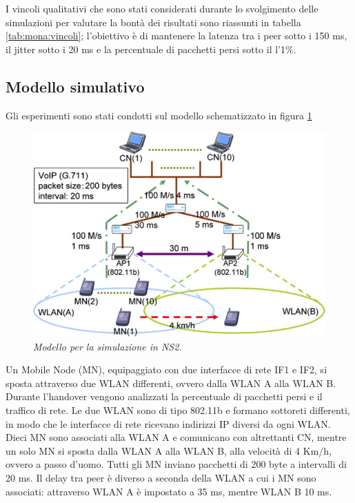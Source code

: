 \documentclass[12pt,a4paper,openright,twoside]{book}
\begin{document}
I vincoli qualitativi che sono stati considerati durante lo
svolgimento delle simulazioni per valutare la bontà dei risultati sono
riassunti in tabella \ref{tab:mona:vincoli}; l'obiettivo è di
mantenere la latenza tra i peer sotto i 150 ms, il jitter sotto i 20
ms e la percentuale di pacchetti persi sotto il l'1\%.

\subsection{Modello simulativo}

Gli esperimenti sono stati condotti sul modello schematizzato in
figura \ref{fig:mona:qos-sim-model}

\begin{figure}
  \centering
  \includegraphics[width=12cm]{img/mona-qos-sim-model}
  \caption{\em Modello per la simulazione in NS2.}
  \label{fig:mona:qos-sim-model}
\end{figure}

Un Mobile Node (MN), equipaggiato con due interfacce di rete IF1 e
IF2, si sposta attraverso due WLAN differenti, ovvero dalla WLAN A
alla WLAN B. Durante l'handover vengono analizzati la percentuale di
pacchetti persi e il traffico di rete. Le due WLAN sono di tipo
802.11b e formano sottoreti differenti, in modo che le interfacce di
rete ricevano indirizzi IP diversi da ogni WLAN. Dieci MN sono
associati alla WLAN A e comunicano con altrettanti CN, mentre un solo
MN si sposta dalla WLAN A alla WLAN B, alla velocità di 4 Km/h, ovvero
a passo d'uomo. Tutti gli MN inviano pacchetti di 200 byte a
intervalli di 20 ms. Il delay tra peer è diverso a seconda della WLAN
a cui i MN sono associati: attraverso WLAN A è impostato a 35 ms,
mentre WLAN B 10 ms.
\end{document}
